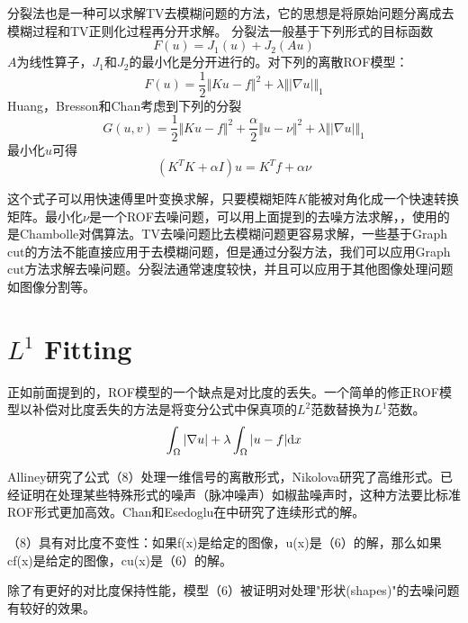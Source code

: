 \documentclass[a4paper,12pt]{article}
\begin{document}
分裂法也是一种可以求解TV去模糊问题的方法，它的思想是将原始问题分离成去模糊过程和TV正则化过程再分开求解。
分裂法一般基于下列形式的目标函数
\begin{displaymath}
F(u)=J_1(u)+J_2(Au)
\end{displaymath}
$A$为线性算子，$J_1$和$J_2$的最小化是分开进行的。对下列的离散ROF模型：
\begin{displaymath}
F(u)=\frac{1}{2}\Vert Ku-f\Vert^2+\lambda\Vert |\nabla u|\Vert_1
\end{displaymath}
Huang\cite{Huang:2008sm}，Bresson和Chan\cite{Bresson:2008sm}考虑到下列的分裂
\begin{displaymath}
G(u,v)=\frac{1}{2}\Vert Ku-f\Vert^2+\frac{\alpha}{2}\Vert u-\nu\Vert^2+\lambda\Vert |\nabla u|\Vert_1
\end{displaymath}
最小化$u$可得
\begin{displaymath}
(K^TK+\alpha I)u=K^Tf+\alpha\nu
\end{displaymath}

这个式子可以用快速傅里叶变换求解，只要模糊矩阵$K$能被对角化成一个快速转换矩阵。最小化$\nu$是一个ROF去噪问题，可以用上面提到的去噪方法求解，\cite{Huang:2008sm}，\cite{Bresson:2008sm}使用的是Chambolle对偶算法。TV去噪问题比去模糊问题更容易求解，一些基于Graph cut的方法不能直接应用于去模糊问题，但是通过分裂方法，我们可以应用Graph cut方法求解去噪问题。分裂法通常速度较快，并且可以应用于其他图像处理问题如图像分割等。

\section{$L^1$ Fitting}

正如前面提到的，ROF模型的一个缺点是对比度的丢失。一个简单的修正ROF模型以补偿对比度丢失的方法是将变分公式中保真项的$L^2$范数替换为$L^1$范数。
\begin{eqnarray}
\int_{\Omega}|\nabla u|+\lambda\int_{\Omega}|u-f|\mathrm{d} x
\end{eqnarray}

Alliney\cite{Alliney:1997l1}研究了公式（8）处理一维信号的离散形式，Nikolova\cite{Nikolova:2002l1}研究了高维形式。已经证明在处理某些特殊形式的噪声（脉冲噪声）如椒盐噪声时，这种方法要比标准ROF形式更加高效。Chan和Esedoglu在\cite{Chan:2004l1}中研究了连续形式的解。

（8）具有对比度不变性：如果f(x)是给定的图像，u(x)是（6）的解，那么如果cf(x)是给定的图像，cu(x)是（6）的解。

除了有更好的对比度保持性能，模型（6）被证明对处理"形状(shapes)"的去噪问题有较好的效果。
\end{document}
